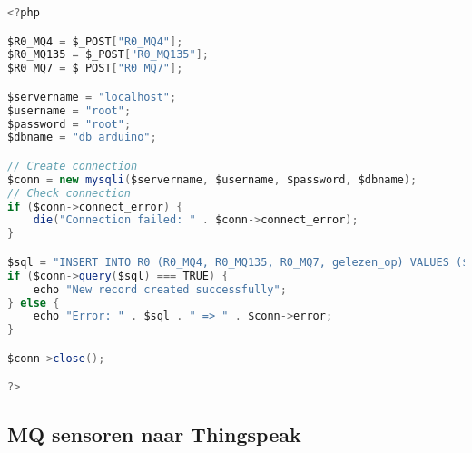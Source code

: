 \begin{lstlisting}[language=Java,caption={insertR0.php}]
<?php

$R0_MQ4 = $_POST["R0_MQ4"];
$R0_MQ135 = $_POST["R0_MQ135"];
$R0_MQ7 = $_POST["R0_MQ7"];

$servername = "localhost";
$username = "root";
$password = "root";
$dbname = "db_arduino";

// Create connection
$conn = new mysqli($servername, $username, $password, $dbname);
// Check connection
if ($conn->connect_error) {
    die("Connection failed: " . $conn->connect_error);
}

$sql = "INSERT INTO R0 (R0_MQ4, R0_MQ135, R0_MQ7, gelezen_op) VALUES ($R0_MQ4, $R0_MQ135, $R0_MQ7, NOW())";
if ($conn->query($sql) === TRUE) {
    echo "New record created successfully";
} else {
    echo "Error: " . $sql . " => " . $conn->error;
}

$conn->close();

?>

\end{lstlisting}

\subsection{MQ sensoren naar Thingspeak}
\label{subsec:script_thingspeak}

